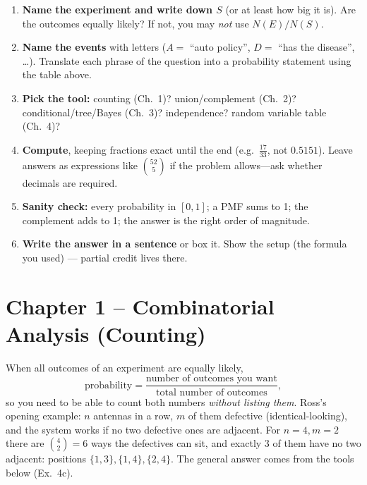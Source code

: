\documentclass[11pt]{article}
\begin{document}
\begin{methodbox}
\begin{enumerate}
\item \textbf{Name the experiment and write down $S$} (or at least how big it is). Are the outcomes equally likely? If not, you may \emph{not} use $N(E)/N(S)$.
\item \textbf{Name the events} with letters ($A=$ ``auto policy'', $D=$ ``has the disease'', \dots). Translate each phrase of the question into a probability statement using the table above.
\item \textbf{Pick the tool:} counting (Ch.~1)? union/complement (Ch.~2)? conditional/tree/Bayes (Ch.~3)? independence? random variable table (Ch.~4)?
\item \textbf{Compute}, keeping fractions exact until the end (e.g.\ $\tfrac{17}{33}$, not $0.5151$). Leave answers as expressions like $\binom{52}{5}$ if the problem allows---ask whether decimals are required.
\item \textbf{Sanity check:} every probability in $[0,1]$; a PMF sums to 1; the complement adds to 1; the answer is the right order of magnitude.
\item \textbf{Write the answer in a sentence} or box it. Show the setup (the formula you used) --- partial credit lives there.
\end{enumerate}
\end{methodbox}

\clearpage
\section{Chapter 1 -- Combinatorial Analysis (Counting)}\label{sec:ch1}

\begin{ideabox}
When all outcomes of an experiment are equally likely,
\[ \text{probability}=\frac{\text{number of outcomes you want}}{\text{total number of outcomes}}, \]
so you need to be able to count both numbers \emph{without listing them}. Ross's opening example: $n$ antennas in a row, $m$ of them defective (identical-looking), and the system works if no two defective ones are adjacent. For $n=4,m=2$ there are $\binom42=6$ ways the defectives can sit, and exactly $3$ of them have no two adjacent: positions $\{1,3\},\{1,4\},\{2,4\}$. The general answer comes from the tools below (Ex.\ 4c).
\end{ideabox}
\end{document}
